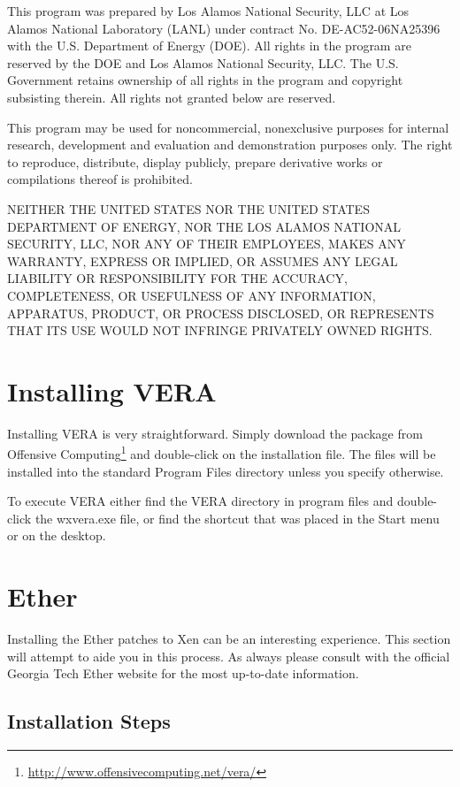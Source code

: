 \documentclass[11pt]{article}
\begin{document}
This program was prepared by Los Alamos National Security, LLC at Los
Alamos National Laboratory (LANL) under contract No. DE-AC52-06NA25396
with the U.S. Department of Energy (DOE). All rights in the program
are reserved by the DOE and Los Alamos National Security, LLC. The
U.S. Government retains ownership of all rights in the program and
copyright subsisting therein. All rights not granted below are
reserved. 

This program may be used for noncommercial, nonexclusive purposes for
internal research, development and evaluation and demonstration
purposes only. The right to reproduce, distribute, display publicly,
prepare derivative works or compilations thereof is prohibited.

NEITHER THE UNITED STATES NOR THE UNITED STATES DEPARTMENT OF ENERGY,
NOR THE LOS ALAMOS NATIONAL SECURITY, LLC, NOR ANY OF THEIR EMPLOYEES,
MAKES ANY WARRANTY, EXPRESS OR IMPLIED, OR ASSUMES ANY LEGAL LIABILITY
OR RESPONSIBILITY FOR THE ACCURACY, COMPLETENESS, OR USEFULNESS OF ANY
INFORMATION, APPARATUS, PRODUCT, OR PROCESS DISCLOSED, OR REPRESENTS
THAT ITS USE WOULD NOT INFRINGE PRIVATELY OWNED RIGHTS.

\section{Installing VERA}

Installing VERA is very straightforward. Simply download the package
from Offensive Computing\footnote{\url{http://www.offensivecomputing.net/vera/}} and
double-click on the installation file. The files will be installed
into the standard Program Files directory unless you specify
otherwise. 

To execute VERA either find the VERA directory in program files and
double-click the wxvera.exe file, or find the shortcut that was placed
in the Start menu or on the desktop. 

\section{Ether}

Installing the Ether patches to Xen can be an interesting
experience. This section will attempt to aide you in this process. As
always please consult with the official Georgia Tech Ether website for
the most up-to-date information.

\subsection{Installation Steps}
\end{document}
